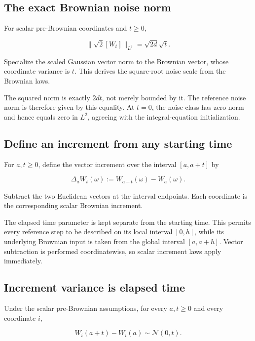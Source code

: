 \documentclass[11pt,a4paper]{article}
\begin{document}
\subsection{\texorpdfstring{The exact Brownian noise norm}{The exact Brownian noise norm}}


For scalar pre-Brownian coordinates and \(t\ge0\),

\[\|\sqrt2[W_t]\|_{L^2}=\sqrt{2d}\sqrt t.\]

Specialize the scaled Gaussian vector norm to the Brownian vector, whose coordinate variance is \(t\). This derives the square-root noise scale from the Brownian laws.



The squared norm is exactly \(2dt\), not merely bounded by it. The reference noise norm is therefore given by this equality. At \(t=0\), the noise class has zero norm and hence equals zero in \(L^2\), agreeing with the integral-equation initialization.


\subsection{\texorpdfstring{Define an increment from any starting time}{Define an increment from any starting time}}


For \(a,t\ge0\), define the vector increment over the interval \([a,a+t]\) by

\[\Delta_aW_t(\omega):=W_{a+t}(\omega)-W_a(\omega).\]

Subtract the two Euclidean vectors at the interval endpoints. Each coordinate is the corresponding scalar Brownian increment.



The elapsed time parameter is kept separate from the starting time. This permits every reference step to be described on its local interval \([0,h]\), while its underlying Brownian input is taken from the global interval \([a,a+h]\). Vector subtraction is performed coordinatewise, so scalar increment laws apply immediately.


\subsection{\texorpdfstring{Increment variance is elapsed time}{Increment variance is elapsed time}}


Under the scalar pre-Brownian assumptions, for every \(a,t\ge0\) and every coordinate \(i\),

\[W_i(a+t)-W_i(a)\sim\mathcal N(0,t).\]
\end{document}
